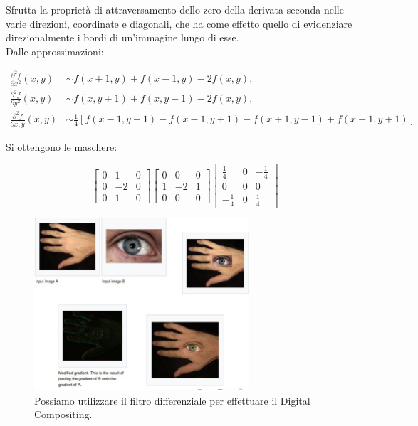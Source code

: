 Sfrutta la proprietà di attraversamento dello zero della derivata seconda nelle varie direzioni, coordinate e diagonali, che ha come effetto quello di evidenziare direzionalmente i bordi di un'immagine lungo di esse.
\\Dalle approssimazioni:

\begin{align*}
    \frac{\partial^2{f}}{\partial{x}^2}(x,y) & \sim f(x+1,y)+f(x-1,y)-2f(x,y),                                \\
    \frac{\partial^2{f}}{\partial{y}^2}(x,y) & \sim f(x,y+1)+f(x,y-1)-2f(x,y),                                \\
    \frac{\partial^2{f}}{\partial{x,y}}(x,y) & \sim \frac{1}{4}[f(x-1,y-1)-f(x-1,y+1)-f(x+1,y-1)+f(x+1, y+1)]
\end{align*}

Si ottengono le maschere:
\begin{center}
    \[
        \begin{bmatrix}
            0 & 1  & 0 \\
            0 & -2 & 0 \\
            0 & 1  & 0
        \end{bmatrix}
        \begin{bmatrix}
            0 & 0  & 0 \\
            1 & -2 & 1 \\
            0 & 0  & 0
        \end{bmatrix}
        \begin{bmatrix}
            \frac{1}{4}  & 0 & -\frac{1}{4} \\
            0            & 0 & 0            \\
            -\frac{1}{4} & 0 & \frac{1}{4}
        \end{bmatrix}
    \]
\end{center}

\begin{figure}[H]
    \centering
    \includegraphics[width=8cm, keepaspectratio]{capitoli/immagini/imgs/digital-composing.png}
    \caption{Possiamo utilizzare il filtro differenziale per effettuare il Digital Compositing.}
\end{figure}

